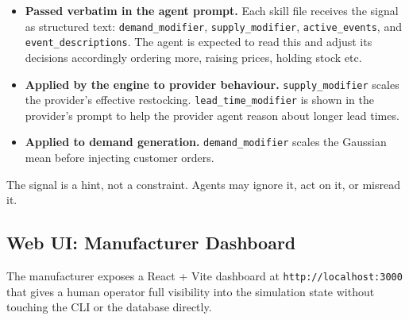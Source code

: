 \documentclass[
]{article}
\providecommand{\tightlist}{%
  \setlength{\itemsep}{0pt}\setlength{\parskip}{0pt}}
\begin{document}
\begin{itemize}
\tightlist
\item
  \textbf{Passed verbatim in the agent prompt.} Each skill file receives
  the signal as structured text: \texttt{demand\_modifier},
  \texttt{supply\_modifier}, \texttt{active\_events}, and
  \texttt{event\_descriptions}. The agent is expected to read this and
  adjust its decisions accordingly ordering more, raising prices, holding
  stock etc.
\item
  \textbf{Applied by the engine to provider behaviour.}
  \texttt{supply\_modifier} scales the provider's effective restocking.
  \texttt{lead\_time\_modifier} is shown in the provider's prompt to
  help the provider agent reason about longer lead times.
\item
  \textbf{Applied to demand generation.} \texttt{demand\_modifier}
  scales the Gaussian mean before injecting customer orders.
\end{itemize}

The signal is a hint, not a constraint. Agents may ignore it, act on it,
or misread it.


\subsection{Web UI: Manufacturer Dashboard}\label{web-ui-manufacturer-dashboard}

The manufacturer exposes a React + Vite dashboard at
\texttt{http://localhost:3000} that gives a human operator full
visibility into the simulation state without touching the CLI or the
database directly.
\end{document}
